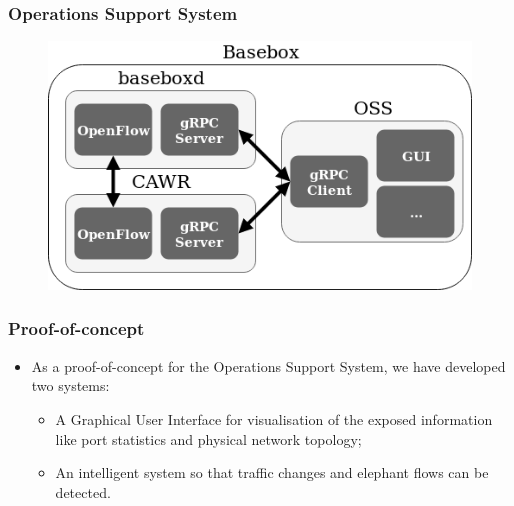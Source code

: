 \documentclass[aspectratio=43]{beamer}
\begin{document}
\begin{frame}
    \frametitle{Operations Support System}
    \begin{figure}
        \includegraphics[width=.7\textwidth]{bisdn/prp_system_low_level}
    \end{figure}

\end{frame}

\begin{frame}
\frametitle{Proof-of-concept}
    \begin{itemize}
        \item As a proof-of-concept for the Operations Support System, we have developed two systems:
        \begin{itemize}
            \item A Graphical User Interface for visualisation of the exposed information like port statistics and physical network topology;
            \item An intelligent system so that traffic changes and elephant flows can be detected.
        \end{itemize}
    \end{itemize}
\end{frame}
\end{document}
